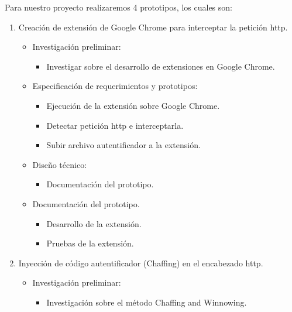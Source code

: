 \documentclass[12pt, a4paper, titlepage]{article}
\begin{document}
        Para nuestro proyecto realizaremos 4 prototipos, los cuales son: 
        \begin{enumerate}
            \item Creación de extensión de Google Chrome para interceptar la petición \acrshort{http}. 
            \begin{itemize}
                \item Investigación preliminar: 
                \begin{itemize}
                    \item Investigar sobre el desarrollo de extensiones en Google Chrome.
                \end{itemize}
                \item Especificación de requerimientos y prototipos:
                \begin{itemize}
                    \item Ejecución de la extensión sobre Google Chrome.
                    \item Detectar petición \acrshort{http} e interceptarla.
                    \item Subir archivo autentificador a la extensión.
                \end{itemize}
                \item Diseño técnico: 
                \begin{itemize}
                    \item Documentación del prototipo.
                \end{itemize}
                \item Documentación del prototipo.
                \begin{itemize}
                    \item Desarrollo de la extensión.
                    \item Pruebas de la extensión.
                \end{itemize}
            \end{itemize}
            \item Inyección de código autentificador (Chaffing) en el encabezado \acrshort{http}. 
            \begin{itemize}
                \item Investigación preliminar: 
                \begin{itemize}
                    \item Investigación sobre el método Chaffing and Winnowing. 
                \end{itemize}

\end{itemize}
\end{enumerate}
\end{document}
